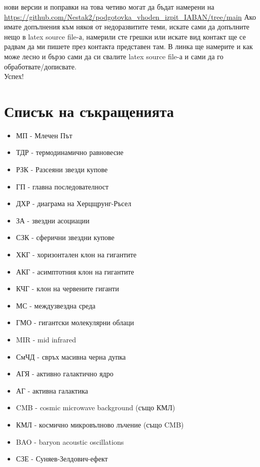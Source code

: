 \documentclass[a4paper,12pt]{article}
\begin{document}
нови версии и поправки на това четиво могат да бъдат намерени на \url{https://github.com/Nestak2/podgotovka_vhoden_izpit_IABAN/tree/main} Ако имате допълнения към някоя от недоразвитите теми, искате сами да допълните нещо в latex source file-а, намерили сте грешки или искате вид контакт ще се радвам да ми пишете през контакта представен там. В линка ще намерите и как може лесно и бързо сами да си свалите latex source file-а и сами да го обработвате/дописвате.\\

Успех!

\section*{Списък на съкращенията}

\begin{itemize}
\item МП - Млечен Път
\item ТДР - термодинамично равновесие
\item РЗК - Разсеяни звезди купове
\item ГП - главна последователност
\item ДХР - диаграма на Херцщрунг-Ръсел
\item ЗА - звездни асоциации
\item СЗК - сферични звездни купове
\item ХКГ - хоризонтален клон на гигантите
\item АКГ - асимптотния клон на гигантите
\item КЧГ - клон на червените гиганти
\item МС - междузвездна среда
\item ГМО - гигантски молекулярни облаци
\item MIR - mid infrared
\item СмЧД - свръх масивна черна дупка
\item АГЯ - активно галактично ядро
\item АГ - активна галактика
\item CMB - cosmic microwave background (също КМЛ)
\item КМЛ - космично микровълново лъчение (също CMB)
\item BAO - baryon acoustic oscillations
\item СЗЕ - Суняев-Зелдович-ефект
\end{itemize}
\end{document}
